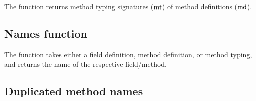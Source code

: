 \documentclass[acmlarge, anonymous, authordraft]{acmart}
\begin{document}
The  function returns method typing signatures ($\mt$) of method definitions ($\md$).

\begin{mathpar}

\end{mathpar}

\subsection{Names function}

The  function takes either a field definition, method definition, or method typing, and returns the name of the respective
field/method.

\begin{mathpar}
\end{mathpar}

\begin{mathpar}
\end{mathpar}

\begin{mathpar}
\end{mathpar}

\begin{mathpar}

\end{mathpar}

\subsection{Duplicated method names}


\begin{mathpar}
\end{mathpar}


\begin{mathpar}
\end{mathpar}
\end{document}
